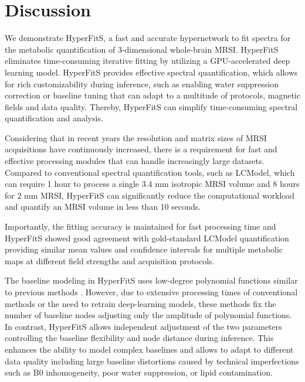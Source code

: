 \documentclass{article}
\begin{document}
\section{Discussion}
	We demonstrate HyperFitS, a fast and accurate hypernetwork to fit spectra for the metabolic quantification of 3-dimensional whole-brain MRSI. HyperFitS eliminates time-consuming iterative fitting by utilizing a GPU-accelerated deep learning model. HyperFitS provides effective spectral quantification, which allows for rich customizability during inference, such as enabling water suppression correction or baseline tuning that can adapt to a multitude of protocols, magnetic fields and data quality. Thereby, HyperFitS can simplify time-consuming spectral quantification and analysis.

    Considering that in recent years the resolution and matrix sizes of MRSI acquisitions have continuously increased, there is a requirement for fast and effective processing modules that can handle increasingly large datasets. Compared to conventional spectral quantification tools, such as LCModel, which can require 1 hour to process a single 3.4 mm isotropic MRSI volume and 8 hours for 2 mm MRSI, HyperFitS can significantly reduce the computational workload and quantify an MRSI volume in less than 10 seconds. 

    Importantly, the fitting accuracy is maintained for fast processing time and HyperFitS showed good agreement with gold-standard LCModel quantification providing similar mean values and confidence intervals for multiple metabolic maps at different field strengths and acquisition protocols. 
    
    The baseline modeling in HyperFitS uses low-degree polynomial functions similar to previous methods \cite{provencher1993estimation} \cite{shamaei2026phive}. However, due to extensive processing times of conventional methods or the need to retrain deep-learning models, these methods fix the number of baseline nodes adjusting only the amplitude of polynomial functions. In contrast, HyperFitS allows independent adjustment of the two parameters controlling the baseline flexibility and node distance during inference. This enhances the ability to model complex baselines and allows to adapt to different data quality including large baseline distortions caused by technical imperfections such as B0 inhomogeneity, poor water suppression, or lipid contamination.
    
\end{document}
